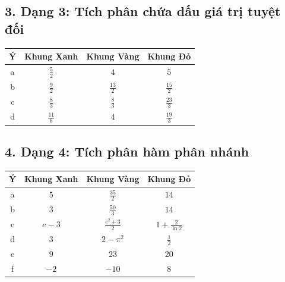 \documentclass[12pt]{article}
\begin{document}
\subsection*{3. Dạng 3: Tích phân chứa dấu giá trị tuyệt đối}
\begin{center}
	\begin{tabular}{|c|c|c|c|}
		\hline
		\textbf{Ý} & \textbf{Khung Xanh} & \textbf{Khung Vàng} & \textbf{Khung Đỏ} \\
		\hline
		a & $\displaystyle \frac{5}{2}$ & $4$ & $5$ \\
		\hline
		b & $\displaystyle \frac{9}{2}$ & $\displaystyle \frac{13}{2}$ & $\displaystyle \frac{15}{2}$ \\
		\hline
		c & $\displaystyle \frac{8}{3}$ & $\displaystyle \frac{8}{3}$ & $\displaystyle \frac{23}{3}$ \\
		\hline
		d & $\displaystyle \frac{11}{6}$ & $4$ & $\displaystyle \frac{19}{3}$ \\
		\hline
	\end{tabular}
\end{center}

\subsection*{4. Dạng 4: Tích phân hàm phân nhánh}
\begin{center}
	\begin{tabular}{|c|c|c|c|}
		\hline
		\textbf{Ý} & \textbf{Khung Xanh} & \textbf{Khung Vàng} & \textbf{Khung Đỏ} \\
		\hline
		a & $5$ & $\displaystyle \frac{35}{2}$ & $14$ \\
		\hline
		b & $3$ & $\displaystyle \frac{50}{3}$ & $14$ \\
		\hline
		c & $e - 3$ & $\displaystyle \frac{e^2 + 3}{2}$ & $1 + \displaystyle \frac{2}{\ln 2}$ \\
		\hline
		d & $3$ & $2 - \pi^2$ & $\displaystyle \frac{1}{2}$ \\
		\hline
		e & $9$ & $23$ & $20$ \\
		\hline
		f & $-2$ & $-10$ & $8$ \\
		\hline
	\end{tabular}
\end{center}
\end{document}
